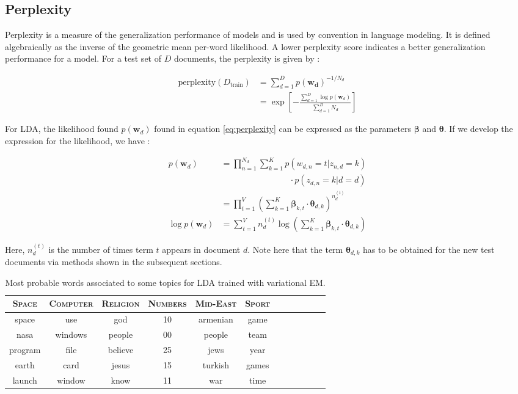 \documentclass{article}
\begin{document}
\subsection{Perplexity}
Perplexity is a measure of the generalization performance of models and is used by convention in language modeling. It is defined algebraically as the inverse of the geometric mean per-word likelihood. A lower perplexity score indicates a better generalization performance for a model. For a test set of $D$ documents, the perplexity is given by :

\begin{align}\label{eq:perplexity}
\mathrm{perplexity}(D_{\mathrm{train}}) & = \sum_{d=1}^{D} p(\mathbf{w_d})^{-1/N_d} \nonumber\\
										& = \exp\left[-\frac{\sum_{d=1}^D \log p(\mathbf{w}_d)}{\sum_{d=1}^D N_d}\right]
\end{align}

For LDA, the likelihood found $p(\mathbf{w}_d)$ found in equation \ref{eq:perplexity} can be expressed as the parameters $\bm{\beta}$ and $\bm{\theta}$. If we develop the expression for the likelihood, we have :

\begin{align}
p(\mathbf{w}_d) & = \prod_{n=1}^{N_d} \sum_{k=1} ^K p(w_{d,n}=t|z_{n,d}=k) \nonumber \\
				& \qquad \qquad \qquad \qquad \cdot p(z_{d,n}=k|d=d) \nonumber\\
				& = \prod_{t=1}^{V} \left( \sum_{k=1}^K \bm{\beta}_{k,t} \cdot \bm{\theta}_{d,k} \right)^{n_d ^{(t)}}\nonumber\\
\log p(\mathbf{w}_d) & = \sum_{t=1}^V n_d ^{(t)} \log \left( \sum_{k=1}^K \bm{\beta}_{k,t} \cdot \bm{\theta}_{d,k} \right)
\end{align}

Here, $n_d ^{(t)}$ is the number of times term $t$ appears in document $d$. Note here that the term $\bm{\theta}_{d,k}$ has to be obtained for the new test documents via methods shown in the subsequent sections.

\begin{table}[htb]
\caption{\label{tab:top_words_LDA} Most probable words associated to some topics for LDA trained with variational EM.}
\vskip 0.15in
\begin{center}
\begin{small}
\begin{tabular}{c|c|c|c|c|c|c|c|c|c|c|c}
\textsc{Space} & \textsc{Computer} & \textsc{Religion} & \textsc{Numbers} & \textsc{Mid-East} & \textsc{Sport}\\
\hline 
space & use & god & 10 & armenian & game\\
nasa & windows & people & 00 & people & team \\
program & file & believe & 25 &  jews & year  \\
earth & card & jesus & 15 &  turkish & games \\
launch & window & know & 11 &  war & time 
\end{tabular}
\end{small}
\end{center}
\label{default}
\end{table}%
\end{document}
